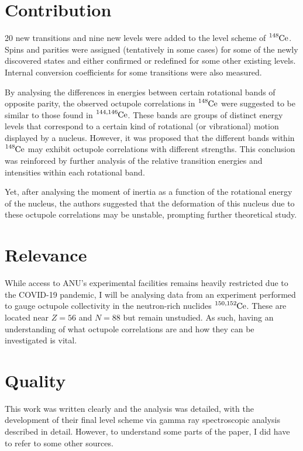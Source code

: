 \documentclass[12pt,a4paper]{article}
\begin{document}
\section*{Contribution}
20 new transitions and nine new levels were added to the level scheme of $\ce{^{148}Ce}$. Spins and parities were assigned (tentatively in some cases) for some of the newly discovered states and either confirmed or redefined for some other existing levels. Internal conversion coefficients for some transitions were also measured.

\medskip
By analysing the differences in energies between certain rotational bands of opposite parity, the observed octupole correlations in $\ce{^{148}Ce}$ were suggested to be similar to those found in $\ce{^{144,146}Ce}$.
These bands are groups of distinct energy levels that correspond to a certain kind of rotational (or vibrational) motion displayed by a nucleus.
However, it was proposed that the different bands within $\ce{^{148}Ce}$ may exhibit octupole correlations with different strengths.
This conclusion was reinforced by further analysis of the relative transition energies and intensities within each rotational band. 

\medskip
Yet, after analysing the moment of inertia as a function of the rotational energy of the nucleus, the authors suggested that the deformation of this nucleus due to these octupole correlations may be unstable, prompting further theoretical study. 

\section*{Relevance}
While access to ANU's experimental facilities remains heavily restricted due to the COVID-19 pandemic, I will be analysing data from an experiment performed to gauge octupole collectivity in the neutron-rich nuclides $\ce{^{150,152}Ce}$.
These are located near $Z=56$ and $N=88$ but remain unstudied.
As such, having an understanding of what octupole correlations are and how they can be investigated is vital.

\section*{Quality}
This work was written clearly and the analysis was detailed, with the development of their final level scheme via gamma ray spectroscopic analysis described in detail. 
However, to understand some parts of the paper, I did have to refer to some other sources.
\end{document}
